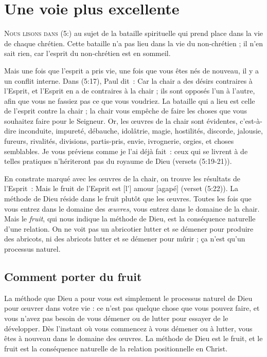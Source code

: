 \chapter{Une voie plus excellente}

\lettrine{N}{ous lisons dans (5:)}
 au sujet de la bataille spirituelle
 qui prend place dans la vie de chaque chrétien.
 Cette bataille n'a pas lieu dans la vie du non-chrétien ;
 il n'en sait rien, car l'esprit du non-chrétien est en sommeil.

Mais une fois que l'esprit a pris vie, une fois que vous êtes nés de nouveau,
 il y a un conflit interne. Dans (5:17), Paul dit~:
 \og Car la chair a des désirs contraires à l'Esprit,
 et l'Esprit en a de contraires à la chair ; ils sont opposés l'un à l'autre,
 afin que vous ne fassiez pas ce que vous voudriez. \fg{}
 La bataille qui a lieu est celle de l'esprit contre la chair ;
 la chair vous empêche de faire les choses que vous souhaitez
 faire pour le Seigneur.
 \og Or, les œuvres de la chair sont évidentes, c'est-à-dire inconduite,
 impureté, débauche, idolâtrie, magie, hostilités, discorde, jalousie,
 fureurs, rivalités, divisions, partis-pris, envie, ivrognerie, orgies,
 et choses semblables. Je vous préviens comme je l'ai déjà fait~:
 ceux qui se livrent à de telles pratiques n'hériteront pas
 du royaume de Dieu \fg{} (versets (5:19-21)).

En constrate marqué avec les œuvres de la chair, on trouve les résultats
 de l'Esprit~: \og Mais le fruit de l'Esprit est [l'] amour [agapé] \fg{}
 (verset (5:22)). La méthode de Dieu réside dans le fruit
 plutôt que les œuvres. Toutes les fois que vous entrez dans le domaine
 des \emph{œuvres}, vous entrez dans le domaine de la chair.
 Mais le \emph{fruit}, qui nous indique la méthode de Dieu, est la conséquence
 naturelle d'une relation. On ne voit pas un abricotier lutter
 et se démener pour produire des abricots, ni des abricots lutter
 et se démener pour mûrir ; ça n'est qu'un processus naturel.


\section{Comment porter du fruit}

La méthode que Dieu a pour vous est simplement le processus naturel
 de Dieu pour œuvrer dans votre vie : ce n'est pas quelque chose
 que vous pouvez faire, et vous n'avez pas besoin de vous démener
 ou de lutter pour essayer de le développer.
 Dès l'instant où vous commencez à vous démener ou à lutter,
 vous êtes à nouveau dans le domaine des œuvres.
 La méthode de Dieu est le fruit, et le fruit est la conséquence
 naturelle de la relation positionnelle en Christ.

